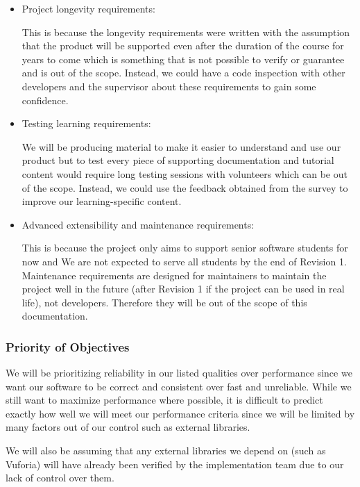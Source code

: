 \documentclass[12pt, titlepage]{article}
\begin{document}
\begin{itemize}
    \item  Project longevity requirements:

    This is because the longevity requirements were written with the assumption that the product will be supported even after the duration of the course for years to come which is something that is not possible to verify or guarantee and is out of the scope. Instead, we could have a code inspection with other developers and the supervisor about these requirements to gain some confidence.

    \item  Testing learning requirements:

    We will be producing material to make it easier to understand and use our product but to test every piece of supporting documentation and tutorial content would require long testing sessions with volunteers which can be out of the scope. Instead, we could use the feedback obtained from the survey to improve our learning-specific content.
    
   \item  Advanced extensibility and maintenance requirements:
   
    This is because the project only aims to support senior software students for now and We are not expected to serve all students by the end of Revision 1.  Maintenance requirements are designed for maintainers to maintain the project well in the future (after Revision 1 if the project can be used in real life), not developers. Therefore they will be out of the scope of this documentation. 
    
\end{itemize}


\subsubsection{Priority of Objectives}
We will be prioritizing reliability in our listed qualities over performance since we want our software to be correct and consistent over fast and unreliable. While we still want to maximize performance where possible, it is difficult to predict exactly how well we will meet our performance criteria since we will be limited by many factors out of our control such as external libraries.

We will also be assuming that any external libraries we depend on (such as Vuforia) will have already been verified by the implementation team due to our lack of control over them. 
\end{document}
